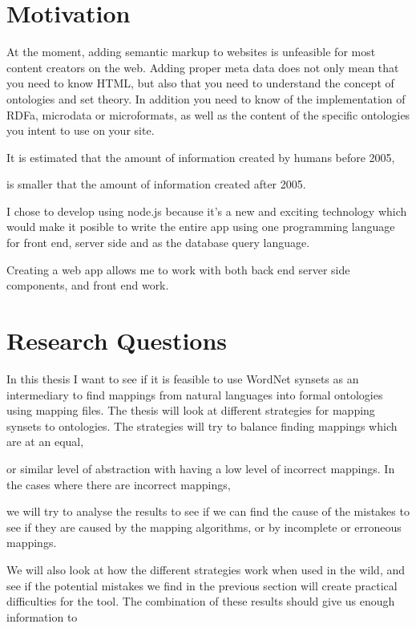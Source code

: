 \section{Motivation}
At the moment, adding semantic markup to websites is unfeasible for most content creators on the web.
Adding proper meta data does not only mean that you need to know HTML, 
but also that you need to understand the concept of ontologies and set theory. 
In addition you need to know of the implementation of RDFa, microdata or microformats, 
as well as the content of the specific ontologies you intent to use on your site.


It is estimated that the amount of information created by humans before 2005, 

is smaller that the amount of information created after 2005.

I chose to develop using node.js because it's a new and exciting technology which would make it posible to write the entire app using one programming language for front end, 
server side and as the database query language.

Creating a web app allows me to work with both back end server side components, 
and front end work. 


\section{Research Questions}
In this thesis I want to see if it is feasible to use WordNet synsets as an intermediary 
to find mappings from natural languages into formal ontologies using mapping files.
The thesis will look at different strategies for mapping synsets to ontologies. 
The strategies will try to balance finding mappings which are at an equal, 

or similar level of abstraction with having a low level of incorrect mappings.
In the cases where there are incorrect mappings, 

we will try to analyse the results to see if we can find the cause of the mistakes to see if they are caused by the 
mapping algorithms, 
or by incomplete or erroneous mappings.

We will also look at how the different strategies work when used in the wild, 
and see if the potential mistakes we find
in the previous section will create practical difficulties for the tool. 
The combination of these results should give us enough information to 
